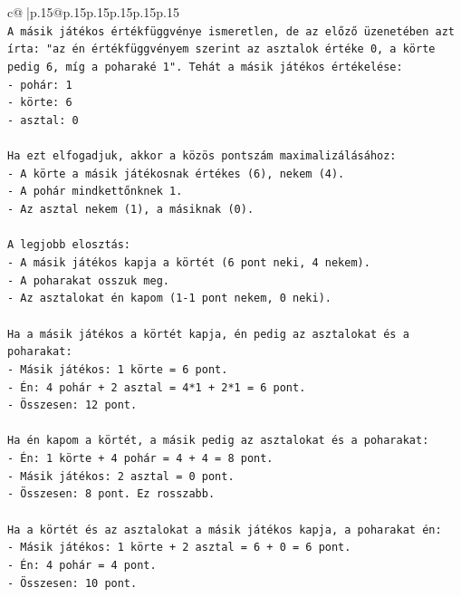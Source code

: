 \documentclass{article}
\begin{document}
{\begin{supertabular}{c@{$\;$}|p{.15\linewidth}@{}p{.15\linewidth}p{.15\linewidth}p{.15\linewidth}p{.15\linewidth}p{.15\linewidth}}
{{{\\ 
\texttt{A másik játékos értékfüggvénye ismeretlen, de az előző üzenetében azt írta: "az én értékfüggvényem szerint az asztalok értéke 0, a körte pedig 6, míg a poharaké 1". Tehát a másik játékos értékelése:} \\
\texttt{{-} pohár: 1} \\
\texttt{{-} körte: 6} \\
\texttt{{-} asztal: 0} \\
\\ 
\texttt{Ha ezt elfogadjuk, akkor a közös pontszám maximalizálásához:} \\
\texttt{{-} A körte a másik játékosnak értékes (6), nekem (4).} \\
\texttt{{-} A pohár mindkettőnknek 1.} \\
\texttt{{-} Az asztal nekem (1), a másiknak (0).} \\
\\ 
\texttt{A legjobb elosztás:} \\
\texttt{{-} A másik játékos kapja a körtét (6 pont neki, 4 nekem).} \\
\texttt{{-} A poharakat osszuk meg.} \\
\texttt{{-} Az asztalokat én kapom (1{-}1 pont nekem, 0 neki).} \\
\\ 
\texttt{Ha a másik játékos a körtét kapja, én pedig az asztalokat és a poharakat:} \\
\texttt{{-} Másik játékos: 1 körte = 6 pont.} \\
\texttt{{-} Én: 4 pohár + 2 asztal = 4*1 + 2*1 = 6 pont.} \\
\texttt{{-} Összesen: 12 pont.} \\
\\ 
\texttt{Ha én kapom a körtét, a másik pedig az asztalokat és a poharakat:} \\
\texttt{{-} Én: 1 körte + 4 pohár = 4 + 4 = 8 pont.} \\
\texttt{{-} Másik játékos: 2 asztal = 0 pont.} \\
\texttt{{-} Összesen: 8 pont. Ez rosszabb.} \\
\\ 
\texttt{Ha a körtét és az asztalokat a másik játékos kapja, a poharakat én:} \\
\texttt{{-} Másik játékos: 1 körte + 2 asztal = 6 + 0 = 6 pont.} \\
\texttt{{-} Én: 4 pohár = 4 pont.} \\
\texttt{{-} Összesen: 10 pont.} \\
}}}
\end{supertabular}}
\end{document}

